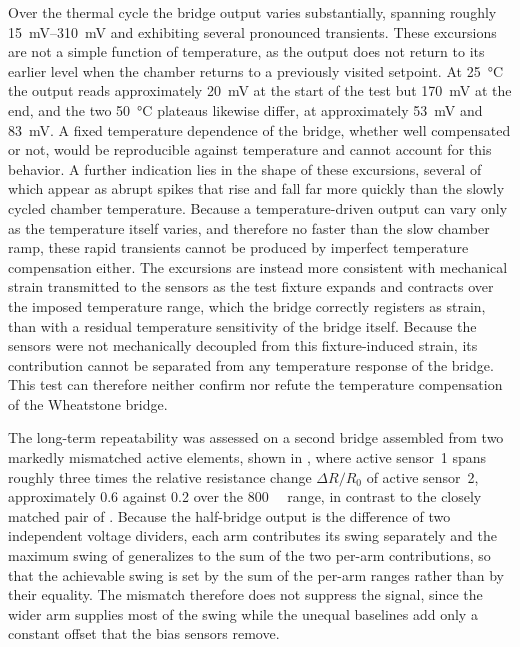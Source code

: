 Over the thermal cycle the bridge output varies substantially, spanning roughly \SIrange{15}{310}{\milli\volt} and exhibiting several pronounced transients. These excursions are not a simple function of temperature, as the output does not return to its earlier level when the chamber returns to a previously visited setpoint. At \SI{25}{\celsius} the output reads approximately \SI{20}{\milli\volt} at the start of the test but \SI{170}{\milli\volt} at the end, and the two \SI{50}{\celsius} plateaus likewise differ, at approximately \SI{53}{\milli\volt} and \SI{83}{\milli\volt}. 
A fixed temperature dependence of the bridge, whether well compensated or not, would be reproducible against temperature and cannot account for this behavior. A further indication lies in the shape of these excursions, several of which appear as abrupt spikes that rise and fall far more quickly than the slowly cycled chamber temperature. Because a temperature-driven output can vary only as the temperature itself varies, and therefore no faster than the slow chamber ramp, these rapid transients cannot be produced by imperfect temperature compensation either.
The excursions are instead more consistent with mechanical strain transmitted to the sensors as the test fixture expands and contracts over the imposed temperature range, which the bridge correctly registers as strain, than with a residual temperature sensitivity of the bridge itself. Because the sensors were not mechanically decoupled from this fixture-induced strain, its contribution cannot be separated from any temperature response of the bridge. This test can therefore neither confirm nor refute the temperature compensation of the Wheatstone bridge.

The long-term repeatability was assessed on a second bridge assembled from two markedly mismatched active elements, shown in , where active sensor~1 spans roughly three times the relative resistance change \(\Delta R/R_0\) of active sensor~2, approximately \num{0.6} against \num{0.2} over the \SI{800}{\micro\strain} range, in contrast to the closely matched pair of . Because the half-bridge output is the difference of two independent voltage dividers, each arm contributes its swing separately and the maximum swing of  generalizes to the sum of the two per-arm contributions, so that the achievable swing is set by the sum of the per-arm ranges rather than by their equality. The mismatch therefore does not suppress the signal, since the wider arm supplies most of the swing while the unequal baselines add only a constant offset that the bias sensors remove.

